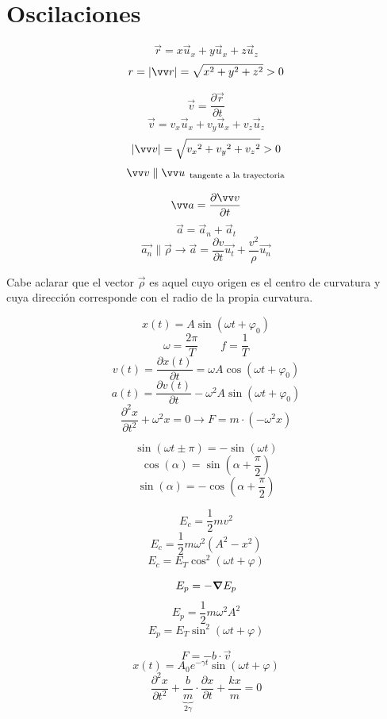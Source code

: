 \documentclass[a4paper]{book}
\begin{document}
\section{Oscilaciones}
\setlength{\columnsep}{20pt}
\begin{fleqn}
	\begin{multicols}{2}
		\[\vec{r} = x \vec{u}_x + y \vec{u}_x + z \vec{u}_z \]
		\[r = \abs{\vec{r}} = \sqrt{x^2 +y^2+z^2} >0\]

		\[\vec{v} = \frac{\partial \vec{r}}{\partial t}\]
		\[\vec{v} = v_x \vec{u}_x + v_y \vec{u}_x + v_z \vec{u}_z\]
		\[\abs{\vec{v}} = \sqrt{{v_x}^2 +{v_y}^2+{v_z}^2} >0\]
		\[\vec{v} \parallel \vec{u}_\text{\, tangente a la trayectoria} \]

		\[\vec{a} =\pdv{\vec{v}}{t}\]
		\[\vec{a} = \vec{a}_n + \vec{a}_t\]
		\[\vec{a_n} \parallel \vec{\rho} \longrightarrow \vec{a} = \frac{\partial v}{\partial t}\vec{u_t} + \frac{v^2}{\rho }\vec{u_n}\]

		\noindent Cabe aclarar que el vector $\vec{\rho}$ es aquel cuyo origen es el centro de curvatura y cuya dirección corresponde con el radio de la propia curvatura.

		\[x(t) = A\sin{\left(\omega t + \varphi_0\right)}\]
		\[\omega = \frac{2\pi}{T} \qquad f = \frac{1}{T}\]
		\[v(t) = \frac{\partial x(t)}{\partial t} = \omega A \cos{\left(\omega t + \varphi_0\right)}\]
		\[a(t) = \frac{\partial v(t)}{\partial t} -\omega^2 A \sin{\left(\omega t + \varphi_0\right)}\]
		\[\frac{\partial ^2 x}{\partial t^2}+\omega^2 x = 0 \longrightarrow F= m\cdot \left( -\omega^2x \right)\]

		\vspace{2 cm}
		\[\sin{\left(\omega t \pm \pi \right)}= -\sin{\left(\omega t\right)}\]
		\[\cos{\left(\alpha\right)} = \sin{\left(\alpha + \frac{\pi}{2}\right)}\]
		\[\sin{\left(\alpha\right)} = - \cos{\left(\alpha + \frac{\pi}{2}\right)}\]

		\[E_c=\frac{1}{2}mv^2\]
		\[E_c=\frac{1}{2}m\omega ^2\left( A^2-x^2 \right)\]
		\[E_c = E_T \cos^2{\left(\omega t + \varphi\right)}\]

		\[E_p = -\grad E_p\]
		\[E_p =\frac{1}{2}m\omega ^2A^2\]
		\[E_p = E_T \sin^2{\left(\omega t + \varphi \right)}\]

		\[F =-b\cdot \vec{v}\]
		\[x(t)=A_0e^{-\gamma t}\sin{\left(\omega t + \varphi\right)}\]
		\[\frac{\partial ^2x}{\partial t^2}+ \underbrace{\frac{b}{m}}_{2\gamma}\cdot \frac{\partial x}{\partial t}+\frac{kx}{m}=0\]

	\end{multicols}
\end{fleqn}
\end{document}
